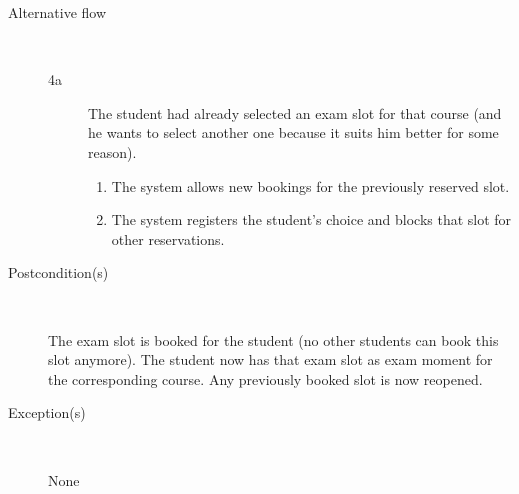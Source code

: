 \begin{description}
	\item[Alternative flow] \
		\begin{description}
			\item[4a] The student had already selected an exam slot for that course (and
			he wants to select another one because it suits him better for some reason).
			\begin{enumerate} 
			  \item The system allows new bookings for the previously reserved slot.
			  \item The system registers the student's choice and blocks
			  that slot for other reservations.
			\end{enumerate}
		\end{description}
	\item[Postcondition(s)] \ 
		\par The exam slot is booked for the student (no other students can book this
		slot anymore). The student now has that exam slot as exam moment for the
		corresponding course. Any previously booked slot is now reopened.
	\item[Exception(s)] \ 
		\par None
\end{description}